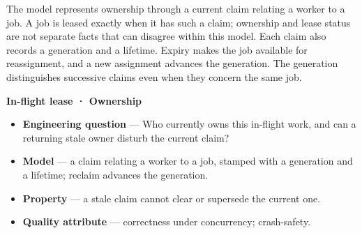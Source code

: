 
The model represents ownership through a current claim relating a worker to a job. A job is leased exactly when it has such a claim; ownership and lease status are not separate facts that can disagree within this model. Each claim also records a generation and a lifetime. Expiry makes the job available for reassignment, and a new assignment advances the generation. The generation distinguishes successive claims even when they concern the same job.

\textbf{In-flight lease · Ownership}

\begin{itemize}
\tightlist
\item
  \textbf{Engineering question} --- Who currently owns this in-flight work, and can a returning stale owner disturb the current claim?
\end{itemize}

\begin{itemize}
\tightlist
\item
  \textbf{Model} --- a claim relating a worker to a job, stamped with a generation and a lifetime; reclaim advances the generation.
\end{itemize}

\begin{itemize}
\tightlist
\item
  \textbf{Property} --- a stale claim cannot clear or supersede the current one.
\end{itemize}

\begin{itemize}
\tightlist
\item
  \textbf{Quality attribute} --- correctness under concurrency; crash-safety.
\end{itemize}


